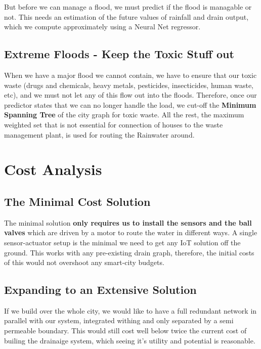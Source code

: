 \documentclass{article}
\begin{document}
But before we can manage a flood, we must predict if the flood is managable or not. This needs an estimation of the future values of rainfall and drain output, which we compute approximately using a Neural Net regressor.

\subsection{Extreme Floods - Keep the Toxic Stuff out}

When we have a major flood we cannot contain, we have to ensure that our toxic waste (drugs and chemicals, heavy metals, pesticides, insecticides, human waste, etc), and we must not let any of this flow out into the floods. Therefore, once our predictor states that we can no longer handle the load, we cut-off the \textbf{Minimum Spanning Tree} of the city graph for toxic waste. All the rest, the maximum weighted set that is not essential for connection of houses to the waste management plant, is used for routing the Rainwater around.



\section{Cost Analysis}

\subsection{The Minimal Cost Solution}

The minimal solution \textbf{only requires us to install the sensors and the ball valves} which are driven by a motor to route the water in different ways. A single sensor-actuator setup is the minimal we need to get any IoT solution off the ground.
This works with any pre-existing drain graph, therefore, the initial costs of this would not overshoot any smart-city budgets.

\subsection{Expanding to an Extensive Solution}

If we build over the whole city, we would like to have a full redundant network in parallel with our system, integrated withing and only separated by a semi permeable boundary. This would still cost well below twice the current cost of builing the drainaige system, which seeing it's utility and potential is reasonable.
\end{document}
